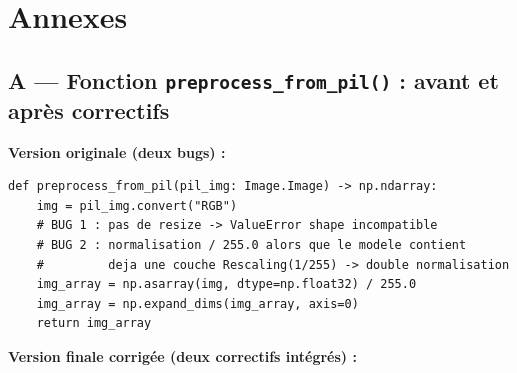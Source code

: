 \documentclass[french, a4paper, 12pt]{article}
\begin{document}
\newpage

\printglossaries

\newpage

\appendix

\section*{Annexes}

\subsection*{A --- Fonction \texttt{preprocess\_from\_pil()} : avant et après correctifs}

\textbf{Version originale (deux bugs) :}

\begin{verbatim}
def preprocess_from_pil(pil_img: Image.Image) -> np.ndarray:
    img = pil_img.convert("RGB")
    # BUG 1 : pas de resize -> ValueError shape incompatible
    # BUG 2 : normalisation / 255.0 alors que le modele contient
    #         deja une couche Rescaling(1/255) -> double normalisation
    img_array = np.asarray(img, dtype=np.float32) / 255.0
    img_array = np.expand_dims(img_array, axis=0)
    return img_array
\end{verbatim}

\textbf{Version finale corrigée (deux correctifs intégrés) :}
\end{document}
